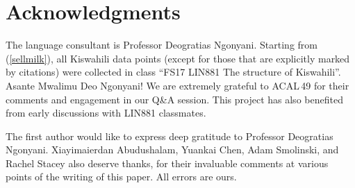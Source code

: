 \documentclass[output=paper]{langscibook}
\begin{document}
\section*{Acknowledgments}
The language consultant is Professor Deogratias Ngonyani. Starting from (\ref{sellmilk}), all Kiswahili data points (except for those that are explicitly marked by citations) were collected in class ``FS17 LIN881 The structure of Kiswahili''. Asante Mwalimu Deo Ngonyani! We are extremely grateful to ACAL\,49 for their comments and engagement in our Q\&A session. This project has also benefited from early discussions with LIN881 classmates.

The first author would like to express deep gratitude to Professor Deogratias Ngonyani. Xiayimaierdan Abudushalam, Yuankai Chen, Adam Smolinski, and Rachel Stacey also deserve thanks, for their invaluable comments at various points of the writing of this paper. All errors are ours. 

\printbibliography[heading=subbibliography,notkeyword=this]
\end{document}
